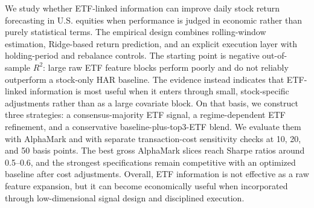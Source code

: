 We study whether ETF-linked information can improve daily stock return forecasting in U.S. equities when performance is judged in economic rather than purely statistical terms. The empirical design combines rolling-window estimation, Ridge-based return prediction, and an explicit execution layer with holding-period and rebalance controls. The starting point is negative out-of-sample $R^2$: large raw ETF feature blocks perform poorly and do not reliably outperform a stock-only HAR baseline. The evidence instead indicates that ETF-linked information is most useful when it enters through small, stock-specific adjustments rather than as a large covariate block. On that basis, we construct three strategies: a consensus-majority ETF signal, a regime-dependent ETF refinement, and a conservative baseline-plus-top3-ETF blend. We evaluate them with AlphaMark and with separate transaction-cost sensitivity checks at 10, 20, and 50 basis points. The best gross AlphaMark slices reach Sharpe ratios around 0.5--0.6, and the strongest specifications remain competitive with an optimized baseline after cost adjustments. Overall, ETF information is not effective as a raw feature expansion, but it can become economically useful when incorporated through low-dimensional signal design and disciplined execution.
